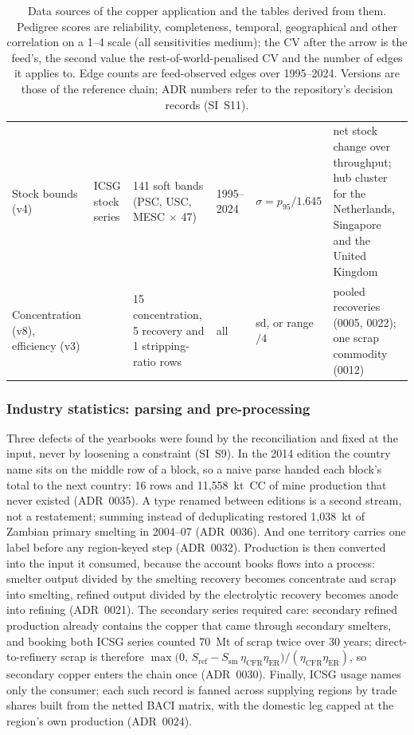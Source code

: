 \begin{table}[t]
\begin{tabular}{@{}p{1.7cm}p{3.0cm}p{2.8cm}p{1.1cm}p{2.3cm}p{4.5cm}@{}}
Stock bounds (v4) & ICSG stock series & 141 soft bands (PSC, USC, MESC
$\times$ 47) & 1995--2024 & $\sigma = p_{95}/1.645$ & net stock change over
throughput; hub cluster for the Netherlands, Singapore and the United Kingdom \\[2pt]
Concentration (v8), efficiency (v3) & \citet{schlesinger2022extractive,
davenport2002extractive} & 15 concentration, 5 recovery and 1 stripping-ratio
rows & all & sd, or range$/4$ & pooled recoveries (0005, 0022); one scrap
commodity (0012) \\
\bottomrule
\end{tabular}
\caption{Data sources of the copper application and the tables derived from
them. Pedigree scores are reliability, completeness, temporal, geographical
and other correlation on a 1--4 scale (all sensitivities medium); the CV
after the arrow is the feed's, the second value the rest-of-world-penalised
CV and the number of edges it applies to. Edge counts are feed-observed
edges over 1995--2024. Versions are those of the reference chain; ADR
numbers refer to the repository's decision records (SI~S11).}
\label{tab:sources}
\end{table}

\subsubsection{Industry statistics: parsing and pre-processing}\label{sec:icsg}

Three defects of the yearbooks were found by the reconciliation and fixed at
the input, never by loosening a constraint (SI~S9). In the 2014 edition the
country name sits on the middle row of a block, so a naive parse handed each
block's total to the next country: 16 rows and 11{,}558~kt~CC of mine
production that never existed (ADR~0035). A type renamed between editions is
a second stream, not a restatement; summing instead of deduplicating
restored 1{,}038~kt of Zambian primary smelting in 2004--07 (ADR~0036). And
one territory carries one label before any region-keyed step (ADR~0032).
Production is then converted into the input it consumed, because the account
books flows into a process: smelter output divided by the smelting recovery
becomes concentrate and scrap into smelting, refined output divided by the
electrolytic recovery becomes anode into refining (ADR~0021). The secondary
series required care: secondary refined production already contains the
copper that came through secondary smelters, and booking both ICSG series
counted 70~Mt of scrap twice over 30 years; direct-to-refinery scrap is
therefore $\max\bigl(0,\, S_{\mathrm{ref}} -
S_{\mathrm{sm}}\,\eta_{\mathrm{CFR}} \eta_{\mathrm{ER}}\bigr)/
(\eta_{\mathrm{CFR}}\eta_{\mathrm{ER}})$, so secondary copper enters the
chain once (ADR~0030). Finally, ICSG usage names only the consumer; each
such record is fanned across supplying regions by trade shares built from
the netted BACI matrix, with the domestic leg capped at the region's own
production (ADR~0024).

